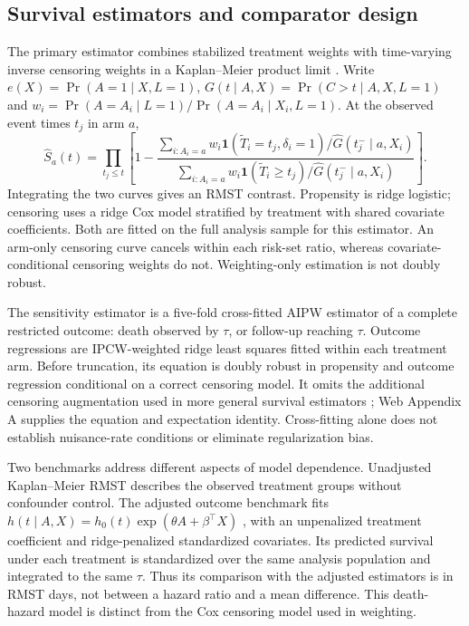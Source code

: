 \documentclass[12pt,letterpaper]{article}
\newcommand{\ind}{\mathbf{1}}
\begin{document}
\subsection{Survival estimators and comparator design}
The primary estimator combines stabilized treatment weights with time-varying inverse censoring weights
in a Kaplan--Meier product limit \citep{robins,conner}. Write $e(X)=\Pr(A=1\mid X,L=1)$,
$G(t\mid A,X)=\Pr(C>t\mid A,X,L=1)$ and $w_i=\Pr(A=A_i\mid L=1)/\Pr(A=A_i\mid X_i,L=1)$.
At the observed event times $t_j$ in arm $a$,
\begin{equation}
\widehat S_a(t)=\prod_{t_j\le t}\left[
1-\frac{\sum_{i:A_i=a}w_i\ind(\widetilde T_i=t_j,\delta_i=1)/\widehat G(t_j^-\mid a,X_i)}
{\sum_{i:A_i=a}w_i\ind(\widetilde T_i\ge t_j)/\widehat G(t_j^-\mid a,X_i)}
\right].\label{eq:km}
\end{equation}
Integrating the two curves gives an RMST contrast. Propensity is ridge logistic;
censoring uses a ridge Cox model stratified by treatment with shared covariate coefficients.
Both are fitted on the full analysis sample for this estimator. An arm-only censoring curve cancels
within each risk-set ratio, whereas covariate-conditional censoring weights do not.
Weighting-only estimation is not doubly robust.

The sensitivity estimator is a five-fold cross-fitted AIPW estimator of a complete restricted outcome:
death observed by $\tau$, or follow-up reaching $\tau$. Outcome regressions are IPCW-weighted ridge
least squares fitted within each treatment arm. Before truncation, its equation is doubly robust
in propensity and outcome regression conditional on a correct censoring model.
It omits the additional censoring augmentation used in more general survival estimators
\citep{bai,zhang}; Web Appendix A supplies the equation and expectation identity.
Cross-fitting alone does not establish nuisance-rate conditions or eliminate regularization bias.

Two benchmarks address different aspects of model dependence. Unadjusted Kaplan--Meier RMST describes
the observed treatment groups without confounder control. The adjusted outcome benchmark fits
$h(t\mid A,X)=h_0(t)\exp(\theta A+\beta^\top X)$ \citep{cox}, with an unpenalized treatment
coefficient and ridge-penalized standardized covariates. Its predicted survival under each treatment is
standardized over the same analysis population and integrated to the same $\tau$.
Thus its comparison with the adjusted estimators is in RMST days, not between a hazard ratio and a mean difference.
This death-hazard model is distinct from the Cox censoring model used in weighting.
\end{document}
